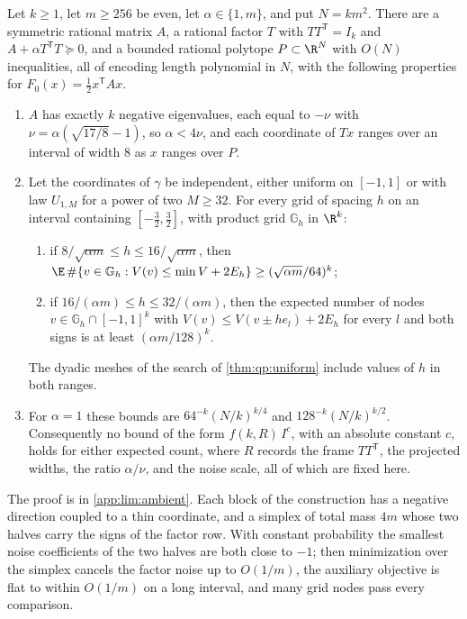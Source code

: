 \begin{theorem}\label{thm:lim:ambient}
Let $k\ge1$, let $m\ge256$ be even, let $\alpha\in\{1,m\}$, and put
$N=km^2$. There are a symmetric rational matrix $A$, a rational factor $T$
with $TT^{\mathsf T}=I_k$ and $A+\alpha T^{\mathsf T}T\succeq0$, and a bounded
rational polytope $P\subset\R^N$ with $O(N)$ inequalities, all of encoding
length polynomial in $N$, with the following properties for
$F_0(x)=\frac12x^{\mathsf T}Ax$.
\begin{enumerate}[label=(\alph*)]
\item\label{it:lim:amb-instance} $A$ has exactly $k$ negative eigenvalues,
each equal to $-\nu$ with $\nu=\alpha(\sqrt{17/8}-1)$, so $\alpha<4\nu$, and
each coordinate of $Tx$ ranges over an interval of width $8$ as $x$ ranges
over $P$.
\item\label{it:lim:amb-count} Let the coordinates of $\gamma$ be
independent, either uniform on $[-1,1]$ or with law $U_{1,M}$ for a power of
two $M\ge32$. For every grid of spacing $h$ on an interval containing
$[-\frac32,\frac32]$, with product grid $\mathbb G_h$ in $\R^k$:
\begin{enumerate}[label=(\roman*)]
\item if $8/\sqrt{\alpha m}\le h\le16/\sqrt{\alpha m}$, then
$\E\,\#\{v\in\mathbb G_h:V(v)\le\min V+2E_h\}\ge(\sqrt{\alpha m}/64)^k$;
\item if $16/(\alpha m)\le h\le32/(\alpha m)$, then the expected number of
nodes $v\in\mathbb G_h\cap[-1,1]^k$ with $V(v)\le V(v\pm he_l)+2E_h$ for
every $l$ and both signs is at least $(\alpha m/128)^k$.
\end{enumerate}
The dyadic meshes of the search of \cref{thm:qp:uniform} include values of
$h$ in both ranges.
\item\label{it:lim:amb-fpt} For $\alpha=1$ these bounds are
$64^{-k}(N/k)^{k/4}$ and $128^{-k}(N/k)^{k/2}$. Consequently no bound of the
form $f(k,R)\,I^c$, with an absolute constant $c$, holds for either expected
count, where $R$ records the frame $TT^{\mathsf T}$, the projected widths,
the ratio $\alpha/\nu$, and the noise scale, all of which are fixed here.
\end{enumerate}
\end{theorem}

The proof is in \cref{app:lim:ambient}. Each block of the construction has a
negative direction coupled to a thin coordinate, and a simplex of total mass
$4m$ whose two halves carry the signs of the factor row. With constant
probability the smallest noise coefficients of the two halves are both
close to $-1$; then minimization over the simplex cancels the factor noise up
to $O(1/m)$, the auxiliary objective is flat to within $O(1/m)$ on a long
interval, and many grid nodes pass every comparison.

